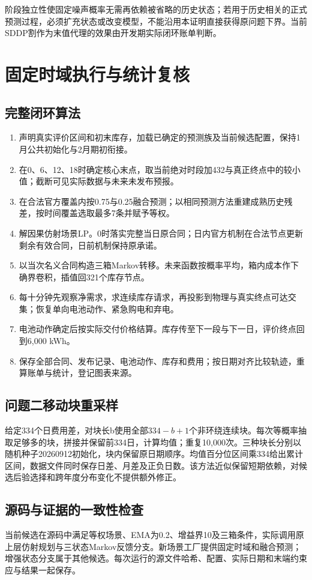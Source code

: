 阶段独立性使固定噪声概率无需再依赖被省略的历史状态；若用于历史相关的正式预测过程，必须扩充状态或改变模型，不能沿用本证明直接获得原问题下界。当前SDDP割作为末值代理的效果由开发期实际闭环账单判断。


\section{固定时域执行与统计复核}
\subsection{完整闭环算法}
\begin{enumerate}
\item 声明真实评价区间和初末库存，加载已确定的预测族及当前候选配置，保持1月公共初始化与2月期初衔接。
\item 在0、6、12、18时确定核心末点，取当前绝对时段加432与真正终点中的较小值；截断可见实际数据与未来未发布预报。
\item 在合法官方覆盖内按0.75与0.25融合预测；以相同预测方法重建成熟历史残差，按时间覆盖选取最多7条并赋予等权。
\item 解因果仿射场景LP。0时落实完整当日原合同；日内官方机制在合法节点更新剩余有效合同，日前机制保持原承诺。
\item 以当次名义合同构造三箱Markov转移。未来函数按概率平均，箱内成本作下确界卷积，插值回321个库存节点。
\item 每十分钟先观察净需求，求连续库存请求，再投影到物理与真实终点可达交集；恢复单向电池动作、紧急购电和弃电。
\item 电池动作确定后按实际交付价格结算。库存传至下一段与下一日，评价终点回到6,000 kWh。
\item 保存全部合同、发布记录、电池动作、库存和费用；按日期对齐比较轨迹，重算账单与统计，登记图表来源。
\end{enumerate}

\subsection{问题二移动块重采样}
给定334个日费用差，对块长b使用全部$334-b+1$个非环绕连续块。每次等概率抽取足够多的块，拼接并保留前334日，计算均值；重复10,000次。三种块长分别以随机种子20260912初始化，块内保留原日期顺序。均值百分位区间乘334给出累计区间，数据文件同时保存日差、月差及正负日数。该方法近似保留短期依赖，对候选后验选择和跨年度分布变化不提供额外修正。

\subsection{源码与证据的一致性检查}
当前候选在源码中满足等权场景、EMA为0.2、增益界10及三箱条件，实际调用原上层仿射规划与三状态Markov反馈分支。新场景工厂提供固定时域和融合预测；增强状态分支属于其他候选。每次运行的源文件哈希、配置、实际日期和末端约束应与结果一起保存。

